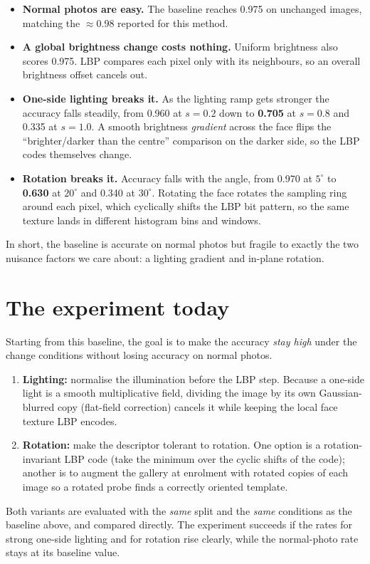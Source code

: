 \documentclass[11pt]{article}
\begin{document}
\begin{itemize}
  \item \textbf{Normal photos are easy.} The baseline reaches 0.975 on unchanged
        images, matching the $\approx0.98$ reported for this method.
  \item \textbf{A global brightness change costs nothing.} Uniform brightness also
        scores 0.975. LBP compares each pixel only with its neighbours, so an overall
        brightness offset cancels out.
  \item \textbf{One-side lighting breaks it.} As the lighting ramp gets stronger the
        accuracy falls steadily, from 0.960 at $s=0.2$ down to \textbf{0.705} at
        $s=0.8$ and 0.335 at $s=1.0$. A smooth brightness \emph{gradient} across the
        face flips the ``brighter/darker than the centre'' comparison on the darker
        side, so the LBP codes themselves change.
  \item \textbf{Rotation breaks it.} Accuracy falls with the angle, from 0.970 at
        $5^\circ$ to \textbf{0.630} at $20^\circ$ and 0.340 at $30^\circ$. Rotating the
        face rotates the sampling ring around each pixel, which cyclically shifts the
        LBP bit pattern, so the same texture lands in different histogram bins and
        windows.
\end{itemize}

In short, the baseline is accurate on normal photos but fragile to exactly the two
nuisance factors we care about: a lighting gradient and in-plane rotation.

\section{The experiment today}

Starting from this baseline, the goal is to make the accuracy \emph{stay high} under
the change conditions without losing accuracy on normal photos.

\begin{enumerate}
  \item \textbf{Lighting:} normalise the illumination before the LBP step. Because a
        one-side light is a smooth multiplicative field, dividing the image by its own
        Gaussian-blurred copy (flat-field correction) cancels it while keeping the
        local face texture LBP encodes.
  \item \textbf{Rotation:} make the descriptor tolerant to rotation. One option is a
        rotation-invariant LBP code (take the minimum over the cyclic shifts of the
        code); another is to augment the gallery at enrolment with rotated copies of
        each image so a rotated probe finds a correctly oriented template.
\end{enumerate}

Both variants are evaluated with the \emph{same} split and the \emph{same} conditions
as the baseline above, and compared directly. The experiment succeeds if the rates for
strong one-side lighting and for rotation rise clearly, while the normal-photo rate
stays at its baseline value.
\end{document}
